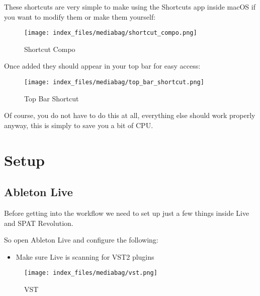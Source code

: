 \documentclass[
  letterpaper,
  DIV=11,
  numbers=noendperiod]{scrreport}
\providecommand{\tightlist}{%
  \setlength{\itemsep}{0pt}\setlength{\parskip}{0pt}}\usepackage{longtable,booktabs,array}
\begin{document}
These shortcuts are very simple to make using the Shortcuts app inside
macOS if you want to modify them or make them yourself:

\begin{figure}

{\centering \texttt{[image: index\_files/mediabag/shortcut\_compo.png]}

}

\caption{Shortcut Compo}

\end{figure}

Once added they should appear in your top bar for easy access:

\begin{figure}

{\centering \texttt{[image: index\_files/mediabag/top\_bar\_shortcut.png]}

}

\caption{Top Bar Shortcut}

\end{figure}

Of course, you do not have to do this at all, everything else should
work properly anyway, this is simply to save you a bit of CPU.

\hypertarget{setup}{%
\section{Setup}\label{setup}}

\hypertarget{ableton-live-1}{%
\subsection{Ableton Live}\label{ableton-live-1}}

Before getting into the workflow we need to set up just a few things
inside Live and SPAT Revolution.

So open Ableton Live and configure the following:

\begin{itemize}
\tightlist
\item
  Make sure Live is scanning for VST2 plugins
\end{itemize}

\begin{figure}

{\centering \texttt{[image: index\_files/mediabag/vst.png]}

}

\caption{VST}

\end{figure}
\end{document}
